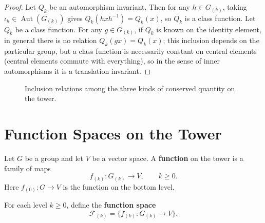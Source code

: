 \begin{proof}
Let $Q_k$ be an automorphism invariant. Then for any $h\in G_{(k)}$, taking $\iota_h\in\operatorname{Aut}(G_{(k)})$ gives $Q_k(hxh^{-1})=Q_k(x)$, so $Q_k$ is a class function. Let $Q_k$ be a class function. For any $g\in G_{(k)}$, if $Q_k$ is known on the identity element, in general there is no relation $Q_k(gx)=Q_k(x)$; this inclusion depends on the particular group, but a class function is necessarily constant on central elements (central elements commute with everything), so in the sense of inner automorphisms it is a translation invariant.
\end{proof}

\begin{figure}[htbp]
\centering
{}
\caption{Inclusion relations among the three kinds of conserved quantity on the tower.}
\label{fig:tower_conservation_inclusion}
\end{figure}

\section{Function Spaces on the Tower}

\begin{definition}\label{def:higher_function}
Let $G$ be a group and let $V$ be a vector space. A \textbf{function} on the tower is a family of maps
\[
f_{(k)}: G_{(k)} \to V,\qquad k\ge 0.
\]
Here $f_{(0)}: G\to V$ is the function on the bottom level.
\end{definition}

\begin{definition}\label{def:higher_function_space}
For each level $k\ge 0$, define the \textbf{function space}
\[
\mathcal{F}_{(k)} = \{f_{(k)}: G_{(k)} \to V\}.
\]
\end{definition}

